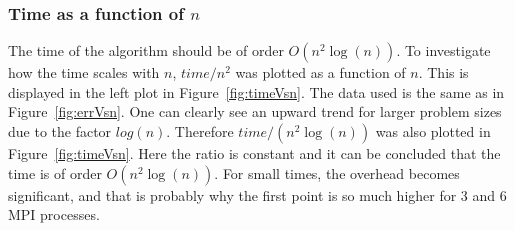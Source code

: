 \subsubsection{Time as a function of $n$}
The time of the algorithm should be of order $O(n^2 \log(n))$. To investigate how the time scales with $n$, $time/n^2$ was plotted as a function of $n$. This is displayed in the left plot in Figure~\ref{fig:timeVsn}. The data used is the same as in Figure~\ref{fig:errVsn}. One can clearly see an upward trend for larger problem sizes due to the factor $log(n)$. Therefore $time/(n^2 \log(n))$ was also plotted in Figure~\ref{fig:timeVsn}. Here the ratio is constant and it can be concluded that the time is of order $O(n^2 \log(n))$. For small times, the overhead becomes significant, and that is probably why the first point is so much higher for 3 and 6 MPI processes. 
